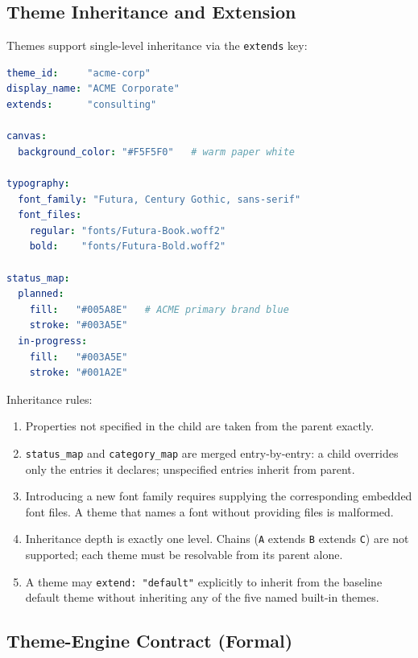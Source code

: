 \subsection{Theme Inheritance and Extension}
\label{sec:theme-inheritance}

Themes support single-level inheritance via the \texttt{extends} key:

\begin{lstlisting}[language=yaml,caption={Custom theme extending Consulting}]
theme_id:     "acme-corp"
display_name: "ACME Corporate"
extends:      "consulting"

canvas:
  background_color: "#F5F5F0"   # warm paper white

typography:
  font_family: "Futura, Century Gothic, sans-serif"
  font_files:
    regular: "fonts/Futura-Book.woff2"
    bold:    "fonts/Futura-Bold.woff2"

status_map:
  planned:
    fill:   "#005A8E"   # ACME primary brand blue
    stroke: "#003A5E"
  in-progress:
    fill:   "#003A5E"
    stroke: "#001A2E"
\end{lstlisting}

Inheritance rules:
\begin{enumerate}
  \item Properties not specified in the child are taken from the parent exactly.
  \item \texttt{status\_map} and \texttt{category\_map} are merged entry-by-entry: a child
        overrides only the entries it declares; unspecified entries inherit from parent.
  \item Introducing a new font family requires supplying the corresponding embedded font
        files. A theme that names a font without providing files is malformed.
  \item Inheritance depth is exactly one level. Chains (\texttt{A} extends \texttt{B}
        extends \texttt{C}) are not supported; each theme must be resolvable from its
        parent alone.
  \item A theme may \texttt{extend: "default"} explicitly to inherit from the baseline
        default theme without inheriting any of the five named built-in themes.
\end{enumerate}

\subsection{Theme-Engine Contract (Formal)}
\label{sec:theme-contract}

